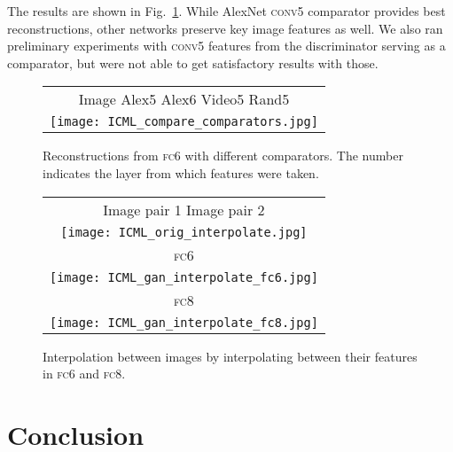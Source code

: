 \documentclass{article}
\newcommand{\conv}{\textsc{conv}}
\newcommand{\fc}{\textsc{fc}}
\begin{document}
The results are shown in Fig.~\ref{fig:different_comparators}.
While AlexNet \conv5 comparator provides best reconstructions, other networks preserve key image features as well.
We also ran preliminary experiments with \conv5 features from the discriminator serving as a comparator, but were not able to get satisfactory results with those.

\begin{figure}
\begin{center}
\setlength{\tabcolsep}{0.1cm}
\renewcommand{\arraystretch}{1}
  \begin{tabular}{c}
  Image \;\;\;\; Alex5 \;\;\; Alex6 \;\;\; Video5 \;\;\;  Rand5 \\
  \texttt{[image: ICML\_compare\_comparators.jpg]}\\
   \end{tabular}
\end{center}
   \caption{Reconstructions from \fc6 with different comparators. The number indicates the layer from which features were taken.}
\label{fig:different_comparators}
\end{figure}

\begin{figure}
\begin{center}
\setlength{\tabcolsep}{0.1cm}
\renewcommand{\arraystretch}{1}
  \begin{tabular}{c}
  Image pair 1 \qquad\qquad\qquad\qquad Image pair 2 \\
  {\texttt{[image: ICML\_orig\_interpolate.jpg]}} \\
  \fc6 \\
  {\texttt{[image: ICML\_gan\_interpolate\_fc6.jpg]}} \\ 
  \fc8 \\
  {\texttt{[image: ICML\_gan\_interpolate\_fc8.jpg]}}
   \end{tabular}
\end{center}
   \caption{Interpolation between images by interpolating between their features in \fc6 and \fc8.}
\label{fig:AlexNet_interpol}
\end{figure}

\section{Conclusion}
\end{document}
